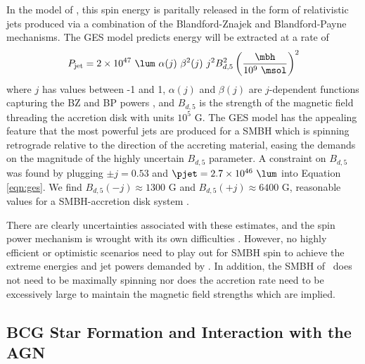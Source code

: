 \documentclass[11pt, preprint]{aastex}
\begin{document}
In the model of \citet[][GES hereafter]{gesspin}, this spin energy is
paritally released in the form of relativistic jets produced via a
combination of the Blandford-Znajek \citep[BZ;][]{bz} and
Blandford-Payne \citep[BP;][]{1982MNRAS.199..883B} mechanisms. The GES
model predicts energy will be extracted at a rate of
\begin{equation}
  P_{\rm{jet}} = 2 \times 10^{47} ~{\lum} ~\alpha(j) ~\beta^2(j) ~j^2
  B_{d,5}^2 \left(\frac{\mbh}{10^9 ~\msol}\right)^2
  \label{eqn:ges}
\end{equation}
where $j$ has values between -1 and 1, $\alpha(j)$ and $\beta(j)$ are
$j$-dependent functions capturing the BZ and BP powers
\citep[see][]{2009ApJ...699L..52G}, and $B_{d,5}$ is the strength of
the magnetic field threading the accretion disk with units $10^5$
G. The GES model has the appealing feature that the most powerful jets
are produced for a SMBH which is spinning retrograde relative to the
direction of the accreting material, easing the demands on the
magnitude of the highly uncertain $B_{d,5}$ parameter. A constraint on
$B_{d,5}$ was found by plugging $\pm j=0.53$ and $\pjet = 2.7 \times
10^{46} ~\lum$ into Equation \ref{eqn:ges}. We find $B_{d,5}(-j)
\approx 1300$ G and $B_{d,5}(+j) \approx 6400$ G, reasonable values
for a SMBH-accretion disk system
\citep[\eg][]{2002Sci...295.1688K}.

There are clearly uncertainties associated with these estimates, and
the spin power mechanism is wrought with its own difficulties
\citep[see][for thorough discussion]{msspin}. However, no highly
efficient or optimistic scenarios need to play out for SMBH spin to
achieve the extreme energies and jet powers demanded by \rbs. In
addition, the SMBH of \rbs\ does not need to be maximally spinning nor
does the accretion rate need to be excessively large to maintain the
magnetic field strengths which are implied.

\subsection{BCG Star Formation and Interaction with the AGN}
\label{sec:bcg}
\end{document}
